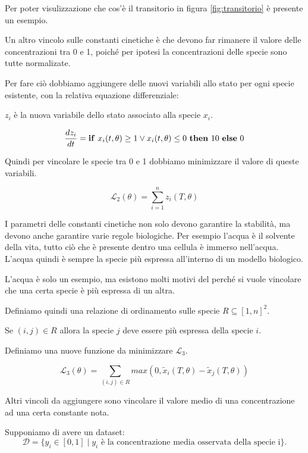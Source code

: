Per poter visulizzazione che cos'è il transitorio in figura \ref{fig:transitorio} è presente un esempio.

Un altro vincolo sulle constanti cinetiche è che devono far rimanere
il valore delle concentrazioni tra 0 e 1, poiché per ipotesi la concentrazioni delle specie sono tutte normalizate.

Per fare ciò dobbiamo aggiungere delle nuovi variabili allo stato per ogni specie esistente, con la relativa equazione differenziale:

$z_i$ è la nuova variabile dello stato associato alla specie $x_i$.

\begin{equation}
    \frac{d z_i}{d t} = \text{\textbf{if} } x_i(t, \theta) \geq 1 \lor x_i(t,\theta) \leq 0 \text{ \textbf{then} } 10 \text{ \textbf{else} } 0
\end{equation}

Quindi per vincolare le specie tra 0 e 1 dobbiamo minimizzare il valore di queste variabili.

\begin{equation}
    \mathcal{L}_2(\theta) = \sum_{i=1}^n z_i(T, \theta)
\end{equation}

I parametri delle constanti cinetiche non solo devono garantire la stabilità, ma devono anche
garantire varie regole biologiche. Per esempio l'acqua è il solvente della vita, tutto ciò che
è presente dentro una cellula è immerso nell'acqua. L'acqua quindi è sempre la specie più espressa all'interno di un modello biologico.

L'acqua è solo un esempio, ma esistono molti motivi del perché si vuole vincolare che una certa specie è più espressa di un altra.

Definiamo quindi una relazione di ordinamento sulle specie $R \subseteq [1,n]^2$.

Se $(i,j) \in R$ allora la specie $j$ deve essere più espressa della specie $i$.

Definiamo una nuove funzione da minimizzare $\mathcal{L}_3$.

\begin{equation}
    \mathcal{L}_3(\theta) = \sum_{(i,j) \in R} max(0, \tilde{x}_i(T, \theta) - \tilde{x}_j(T, \theta))
\end{equation}

Altri vincoli da aggiungere sono vincolare il valore medio di una concentrazione ad una certa constante nota.

Supponiamo di avere un dataset:
\[
    \mathcal{D} = \{ y_i \in [0,1] \mid y_i \text{ è la concentrazione media osservata della specie i}\}.
\]

